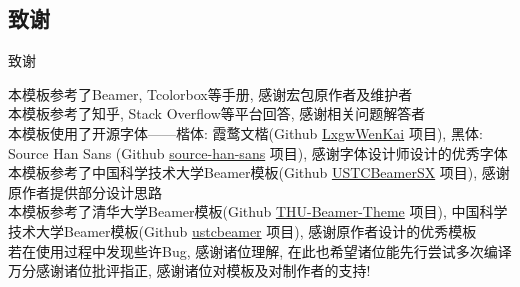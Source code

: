 \documentclass[hyperref,UTF8,11pt,CJK]{beamer}
\begin{document}
\subsection{致谢}
\begin{frame}{致谢}
	\begin{center}
		本模板参考了Beamer, Tcolorbox等手册, 感谢宏包原作者及维护者\\[1ex]
		本模板参考了知乎, Stack Overflow等平台回答, 感谢相关问题解答者\\[1ex]
		本模板使用了开源字体——楷体: 霞鹜文楷(Github \href{https://github.com/lxgw/LxgwWenKai/}{\color{BSblue}LxgwWenKai} 项目), 黑体: Source Han Sans (Github \href{https://github.com/adobe-fonts/source-han-sans/}{\color{BSblue}source-han-sans} 项目), 感谢字体设计师设计的优秀字体\\[1ex]
		本模板参考了中国科学技术大学Beamer模板(Github \href{https://github.com/ysx2000/USTCBeamerSX/}{\color{BSblue}USTCBeamerSX} 项目), 感谢原作者提供部分设计思路\\[1ex]
		本模板参考了清华大学Beamer模板(Github \href{https://github.com/tuna/THU-Beamer-Theme/}{\color{BSblue}THU-Beamer-Theme} 项目), 中国科学技术大学Beamer模板(Github \href{https://github.com/ustctug/ustcbeamer/}{\color{BSblue}ustcbeamer} 项目), 感谢原作者设计的优秀模板\\[1ex]
		
		若在使用过程中发现些许Bug, 感谢诸位理解, 在此也希望诸位能先行尝试多次编译\\[1ex]
		万分感谢诸位批评指正, 感谢诸位对模板及对制作者的支持!
	\end{center}
\end{frame}

\end{document}
